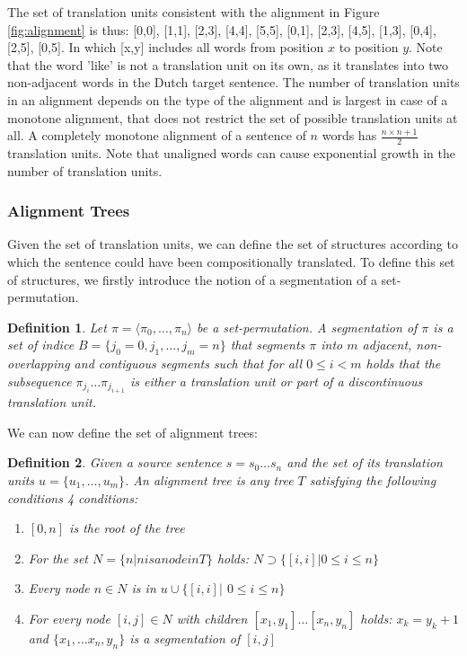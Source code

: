 \documentclass{report}
\theoremstyle{definition}
\theoremstyle{plain}
\newtheorem{definition}{Definition}
\begin{document}
The set of translation units consistent with the alignment in Figure \ref{fig:alignment} is thus: {[0,0], [1,1], [2,3], [4,4], [5,5], [0,1], [2,3], [4,5], [1,3], [0,4], [2,5], [0,5]}. In which [x,y] includes all words from position $x$ to position $y$. Note that the word 'like' is not a translation unit on its own, as it translates into two non-adjacent words in the Dutch target sentence. The number of translation units in an alignment depends on the type of the alignment and is largest in case of a monotone alignment, that does not restrict the set of possible translation units at all. A completely monotone alignment of a sentence of $n$ words has $\frac{n\times n+1}{2}$ translation units. Note that unaligned words can cause exponential growth in the number of translation units.

\subsubsection{Alignment Trees} Given the set of translation units, we can define the set of structures according to which the sentence could have been compositionally translated. To define this set of structures, we firstly introduce the notion of a segmentation of a set-permutation.

\begin{definition}
Let $\pi = \langle \pi_0, \ldots,\pi_n\rangle$ be a set-permutation. A segmentation of $\pi$ is a set of indice $B = \{j_0 = 0, j_1, \ldots ,j_m = n\}$ that segments $\pi$ into $m$ adjacent, non-overlapping and contiguous segments such that for all $0\leq i < m$ holds that the subsequence $\pi_{j_i}\ldots\pi_{j_{i+1}}$ is either a translation unit or part of a discontinuous translation unit.%
\end{definition}

We can now define the set of alignment trees:

\begin{definition}
Given a source sentence $s = s_0 \ldots s_n$ and the set of its translation units $u = \{u_1,\ldots,u_m\}$. An alignment tree is any tree $T$ satisfying the following conditions 4 conditions:\begin{enumerate}
\item $[0,n]$ is the root of the tree
\item For the set $N = \{n | n is a node in T\}$ holds: $N\supset \{[i,i]| 0\leq i\leq n\}$
\item Every node $n\in N$ is in $u\cup \{[i,i]|$ $0\leq i\leq n\} $
\item For every node $[i,j] \in N$ with children $[x_1,y_1]\ldots [x_n,y_n]$ holds: $x_k = y_k+1$ and $\{x_1,\ldots x_n, y_n\}$ is a segmentation of $[i,j]$ %
\end{enumerate}
\end{definition}
\end{document}
